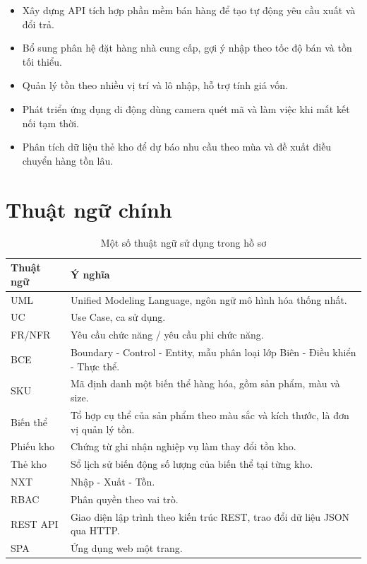 \documentclass[12pt,a4paper]{report}
\newcommand{\tablehead}[1]{\cellcolor{HUSTBlue}\color{white}\textbf{#1}}
\begin{document}
\begin{itemize}
\item Xây dựng API tích hợp phần mềm bán hàng để tạo tự động yêu cầu xuất và đổi trả.
\item Bổ sung phân hệ đặt hàng nhà cung cấp, gợi ý nhập theo tốc độ bán và tồn tối thiểu.
\item Quản lý tồn theo nhiều vị trí và lô nhập, hỗ trợ tính giá vốn.
\item Phát triển ứng dụng di động dùng camera quét mã và làm việc khi mất kết nối tạm thời.
\item Phân tích dữ liệu thẻ kho để dự báo nhu cầu theo mùa và đề xuất điều chuyển hàng tồn lâu.
\end{itemize}

\appendix
\chapter{Thuật ngữ chính}

\begin{table}[H]
\centering
\caption{Một số thuật ngữ sử dụng trong hồ sơ}
\small
\begin{tabularx}{\textwidth}{L{3.2cm}Y}
\toprule
\tablehead{Thuật ngữ} & \tablehead{Ý nghĩa}\\
\midrule
UML & Unified Modeling Language, ngôn ngữ mô hình hóa thống nhất.\\
UC & Use Case, ca sử dụng.\\
FR/NFR & Yêu cầu chức năng / yêu cầu phi chức năng.\\
BCE & Boundary - Control - Entity, mẫu phân loại lớp Biên - Điều khiển - Thực thể.\\
SKU & Mã định danh một biến thể hàng hóa, gồm sản phẩm, màu và size.\\
Biến thể & Tổ hợp cụ thể của sản phẩm theo màu sắc và kích thước, là đơn vị quản lý tồn.\\
Phiếu kho & Chứng từ ghi nhận nghiệp vụ làm thay đổi tồn kho.\\
Thẻ kho & Sổ lịch sử biến động số lượng của biến thể tại từng kho.\\
NXT & Nhập - Xuất - Tồn.\\
RBAC & Phân quyền theo vai trò.\\
REST API & Giao diện lập trình theo kiến trúc REST, trao đổi dữ liệu JSON qua HTTP.\\
SPA & Ứng dụng web một trang.\\
\bottomrule
\end{tabularx}
\end{table}
\end{document}
